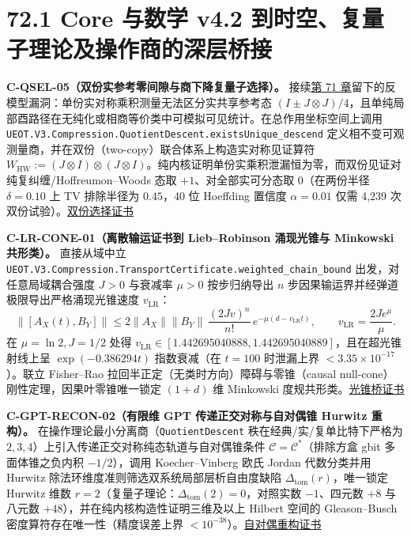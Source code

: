 \documentclass[
  11pt,
  oneside]{book}
\begin{document}
\section{72.1 Core 与数学 v4.2 到时空、复量子理论及操作商的深层桥接}

\protect\hypertarget{c-qsel-05}{}{}

\textbf{C-QSEL-05（双份实参考零间隙与商下降复量子选择）。}
接续\protect\hyperlink{ch-71}{第 71
章}留下的反模型漏洞：单份实对称乘积测量无法区分实共享参考态
\((I \pm J\otimes J)/4\)，且单纯局部酉路径在无纯化或相商等价类中可模拟可见统计。在总作用坐标空间上调用
\texttt{UEOT.\allowbreak V3.\allowbreak Compression.\allowbreak Quotient\allowbreak Descent.\allowbreak exists\allowbreak Unique\_\allowbreak descend}
定义相不变可观测量商，并在双份（two-copy）联合体系上构造实对称见证算符
\(W_{\mathrm{HW}} := (J\otimes I)\otimes(J\otimes I)\)。纯内核证明单份实乘积泄漏恒为零，而双份见证对纯复纠缠/Hoffreumon--Woods
态取 \(+1\)、对全部实可分态取 \(0\)（在两份半径 \(\delta = 0.10\) 上 TV
排除半径为 \(0.45\)，40 位 Hoeffding 置信度 \(\alpha = 0.01\) 仅需 4,239
次双份试验）。\href{../../unification/quantum_selection/result.json}{双份选择证书}

\protect\hypertarget{c-lr-cone-01}{}{}

\textbf{C-LR-CONE-01（离散输运证书到 Lieb--Robinson 涌现光锥与 Minkowski
共形类）。} 直接从域中立
\texttt{UEOT.\allowbreak V3.\allowbreak Compression.\allowbreak Transport\allowbreak Certificate.\allowbreak weighted\_\allowbreak chain\_\allowbreak bound}
出发，对任意局域耦合强度 \(J>0\) 与衰减率 \(\mu>0\) 按步归纳导出 \(n\)
步因果输运界并经弹道极限导出严格涌现光锥速度 \(v_{\mathrm{LR}}\)： \[
\|[A_X(t), B_Y]\| \le 2\|A_X\|\|B_Y\|\,\frac{(2 J v)^n}{n!}\,e^{-\mu(d - v_{\mathrm{LR}} t)}, \qquad v_{\mathrm{LR}} = \frac{2 J e^{\mu}}{\mu}.
\] 在 \(\mu=\ln 2, J=1/2\) 处得
\(v_{\mathrm{LR}} \in [1.442695040888, 1.442695040889]\)，且在超光锥射线上呈
\(\exp(-0.386294 t)\) 指数衰减（在 \(t=100\) 时泄漏上界
\(<3.35\times 10^{-17}\)）。联立 Fisher--Rao
拉回半正定（无类时方向）障碍与零锥（causal
null-cone）刚性定理，因果叶零锥唯一锁定 \((1+d)\) 维 Minkowski
度规共形类。\href{../../unification/lieb_robinson_lightcone/result.json}{光锥桥证书}

\protect\hypertarget{c-gpt-recon-02}{}{}

\textbf{C-GPT-RECON-02（有限维 GPT 传递正交对称与自对偶锥 Hurwitz
重构）。} 在操作理论最小分离商（\texttt{Quotient\allowbreak Descent}
秩在经典/实/复单比特下严格为
\(2, 3, 4\)）上引入传递正交对称纯态轨道与自对偶锥条件
\(\mathcal{C} = \mathcal{C}^*\)（排除方盒 gbit 多面体锥之负内积
\(-1/2\)），调用 Koecher--Vinberg 欧氏 Jordan 代数分类并用 Hurwitz
除法环维度准则筛选双系统局部层析自由度缺陷
\(\Delta_{\mathrm{tom}}(r)\)，唯一锁定 Hurwitz 维数
\(r=2\)（复量子理论：\(\Delta_{\mathrm{tom}}(2)=0\)，对照实数
\(-1\)、四元数 \(+8\) 与八元数 \(+48\)），并在纯内核构造性证明三维及以上
Hilbert 空间的 Gleason--Busch 密度算符存在唯一性（精度误差上界
\(<10^{-38}\)）。\href{../../unification/gpt_self_dual_reconstruction/result.json}{自对偶重构证书}
\end{document}
